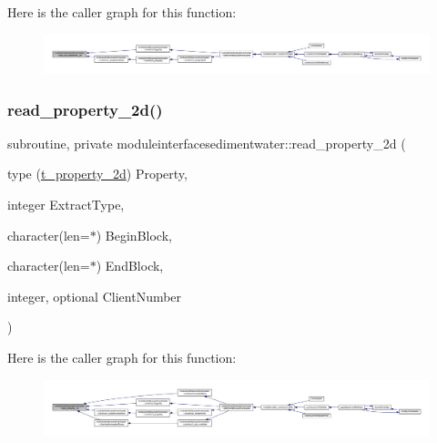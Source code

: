 Here is the caller graph for this function\+:\nopagebreak
\begin{figure}[H]
\begin{center}
\leavevmode
\includegraphics[width=350pt]{namespacemoduleinterfacesedimentwater_ae36783dede749530b40ad98b22316f39_icgraph}
\end{center}
\end{figure}
\mbox{\label{namespacemoduleinterfacesedimentwater_a8cfac9807ceccbcd4aa2d115757fe179}} 
\subsubsection{\texorpdfstring{read\+\_\+property\+\_\+2d()}{read\_property\_2d()}}
{\footnotesize\ttfamily subroutine, private moduleinterfacesedimentwater\+::read\+\_\+property\+\_\+2d (\begin{DoxyParamCaption}\item[{type (\mbox{\hyperlink{structmoduleinterfacesedimentwater_1_1t__property__2d}{t\+\_\+property\+\_\+2d}})}]{Property,  }\item[{integer}]{Extract\+Type,  }\item[{character(len=$\ast$)}]{Begin\+Block,  }\item[{character(len=$\ast$)}]{End\+Block,  }\item[{integer, optional}]{Client\+Number }\end{DoxyParamCaption})\hspace{0.3cm}{\ttfamily [private]}}

Here is the caller graph for this function\+:\nopagebreak
\begin{figure}[H]
\begin{center}
\leavevmode
\includegraphics[width=350pt]{namespacemoduleinterfacesedimentwater_a8cfac9807ceccbcd4aa2d115757fe179_icgraph}
\end{center}
\end{figure}
\mbox{\label{namespacemoduleinterfacesedimentwater_a4e44b21fdb18ed4d0fbeb1a77a327fff}} 
